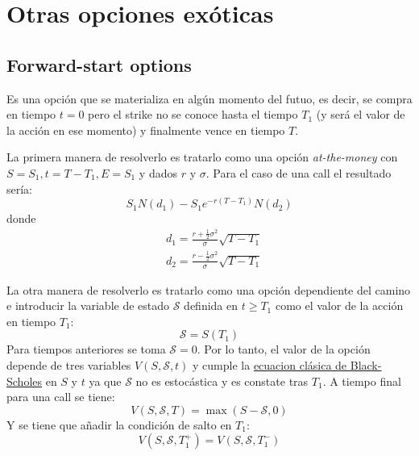 \section{Otras opciones exóticas}


\subsection{Forward-start options}
Es una opción que se materializa en algún momento del futuo, es decir, se compra en tiempo $t=0$ pero el strike no se conoce hasta el tiempo $T_1$ (y será el valor de la acción en ese momento) y finalmente vence en tiempo $T$.

La primera manera de resolverlo es tratarlo como una opción \textit{at-the-money} con $S=S_1, t=T-T_1, E=S_1$ y dados $r$ y $\sigma$. Para el caso de una call el resultado sería:
\begin{equation*}
    S_1 N(d_1) - S_1 e^{-r(T-T_1)} N(d_2)
\end{equation*}
donde
\begin{align*}
    & d_1 = \frac{r + \frac{1}{2}\sigma^2}{\sigma} \sqrt{T-T_1} \\
    & d_2 = \frac{r - \frac{1}{2}\sigma^2}{\sigma} \sqrt{T-T_1}
\end{align*}

La otra manera de resolverlo es tratarlo como una opción dependiente del camino e introducir la variable de estado $\mathcal{S}$ definida en $t \geq T_1$ como el valor de la acción en tiempo $T_1$:
\begin{equation*}
    \mathcal{S} = S(T_1)
\end{equation*}
Para tiempos anteriores se toma $\mathcal{S}=0$. Por lo tanto, el valor de la opción depende de tres variables $V(S, \mathcal{S}, t)$ y cumple la \underline{ecuacion clásica de Black-Scholes} en $S$ y $t$ ya que $\mathcal{S}$ no es estocástica y es constate tras $T_1$. A tiempo final para una call se tiene:
\begin{equation*}
    \boxed{V(S, \mathcal{S}, T) = \max(S - \mathcal{S}, 0)}
\end{equation*}
Y se tiene que añadir la condición de salto en $T_1$:
\begin{equation*}
    \boxed{V(S, \mathcal{S}, T_1^+) = V(S, \mathcal{S}, T_1^-)}
\end{equation*}





